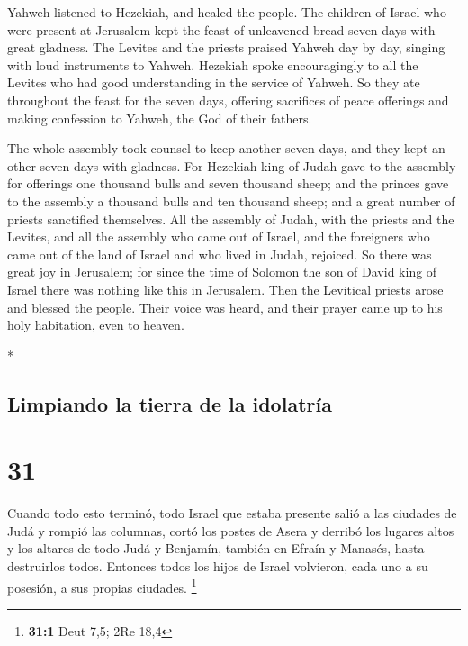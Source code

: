\begin{paracol}{2}
\begin{otherlanguage}{english}
 Yahweh listened to Hezekiah, and healed the people.
 The children of Israel who were present at Jerusalem
kept the feast of unleavened bread seven days with great gladness. The
Levites and the priests praised Yahweh day by day, singing with loud
instruments to Yahweh.  Hezekiah spoke encouragingly to
all the Levites who had good understanding in the service of Yahweh. So
they ate throughout the feast for the seven days, offering sacrifices of
peace offerings and making confession to Yahweh, the God of their
fathers.

 The whole assembly took counsel to keep another seven
days, and they kept another seven days with gladness. 
For Hezekiah king of Judah gave to the assembly for offerings one
thousand bulls and seven thousand sheep; and the princes gave to the
assembly a thousand bulls and ten thousand sheep; and a great number of
priests sanctified themselves.  All the assembly of
Judah, with the priests and the Levites, and all the assembly who came
out of Israel, and the foreigners who came out of the land of Israel and
who lived in Judah, rejoiced.  So there was great joy in
Jerusalem; for since the time of Solomon the son of David king of Israel
there was nothing like this in Jerusalem.  Then the
Levitical priests arose and blessed the people. Their voice was heard,
and their prayer came up to his holy habitation, even to heaven.

\end{otherlanguage}

\switchcolumn[0]*

\hypertarget{limpiando-la-tierra-de-la-idolatruxeda}{%
\subsection{Limpiando la tierra de la
idolatría}\label{limpiando-la-tierra-de-la-idolatruxeda}}

\hypertarget{section-60}{%
\section{31}\label{section-60}}

 Cuando todo esto terminó, todo Israel que estaba presente
salió a las ciudades de Judá y rompió las columnas, cortó los postes de
Asera y derribó los lugares altos y los altares de todo Judá y Benjamín,
también en Efraín y Manasés, hasta destruirlos todos. Entonces todos los
hijos de Israel volvieron, cada uno a su posesión, a sus propias
ciudades. \footnote{\textbf{31:1} Deut 7,5; 2Re 18,4}


\end{paracol}
